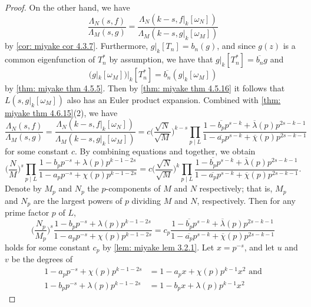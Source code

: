 \documentclass[10pt,leqno,twoside]{article}
\theoremstyle{plain}
\theoremstyle{definition}
\numberwithin{equation}{section}
\numberwithin{lem}{section}
\begin{document}
\begin{proof}
    On the other hand, we have
    \[\frac{\varLambda_N(s,f)}{\varLambda_M(s,g)} = \frac{\varLambda_N(k-s,f|_k[\omega_N])}{\varLambda_M(k-s,g|_k[\omega_M])}\] by \cref{cor: miyake cor 4.3.7}. Furthermore, $g|_k[T_n] = b_n(g)$, and since $g(z)$ is a common eigenfunction of $T^\ast_n$ by assumption, we have that $g|_k[T^\ast_n] = \overline{b_n}g$ and 
    \[(g|_k[\omega_M])|_k[T^\ast_n] = \overline{b_n}(g|_k[\omega_M])\] by \cref{thm: miyake thm 4.5.5}. Then by \cref{thm: miyake thm 4.5.16} it follows that $L(s, g|_k[\omega_M])$ also has an Euler product expansion. Combined with \cref{thm: miyake thm 4.6.15}(2), we have 
    \begin{equation}\label{eqn: ratio shifted varLambdas}
        \frac{\varLambda_N(s,f)}{\varLambda_M(s,g)} = \frac{\varLambda_N(k-s,f|_k[\omega_N])}{\varLambda_M(k-s,g|_k[\omega_M])} = c\bigg(\frac{\sqrt{N}}{\sqrt{M}}\bigg)^{k-s}\prod_{p\mid L}\frac{1-\overline{b_p}p^{s-k} + \overline{\lambda}(p)p^{2s-k-1}}{1-\overline{a_p}p^{s-k} + \overline{\chi}(p)p^{2s-k-1}}
    \end{equation} for some constant $c$. By combining equations  and  together, we obtain
    \[\bigg(\frac{N}{M}\bigg)^s\prod_{p\mid L}\frac{1-b_pp^{-s} + \lambda(p)p^{k-1-2s}}{1-a_pp^{-s} + \chi(p)p^{k-1-2s}} = c\bigg(\frac{\sqrt{N}}{\sqrt{M}}\bigg)^k\prod_{p\mid L}\frac{1-\overline{b_p}p^{s-k} + \overline{\lambda}(p)p^{2s-k-1}}{1-\overline{a_p}p^{s-k} + \overline{\chi}(p)p^{2s-k-1}}.\]
    Denote by $M_p$ and $N_p$ the $p$-components of $M$ and $N$ respectively; that is, $M_p$ and $N_p$ are the largest powers of $p$ dividing $M$ and $N$, respectively. Then for any prime factor $p$ of $L$, 
    \begin{equation}\label{eqn: p-comps}
        \bigg(\frac{N_p}{M_p}\bigg)^s\frac{1-b_pp^{-s} + \lambda(p)p^{k-1-2s}}{1-a_pp^{-s} + \chi(p)p^{k-1-2s}} = c_p
        \frac{1-\overline{b_p}p^{s-k} + \overline{\lambda}(p)p^{2s-k-1}}{1-\overline{a_p}p^{s-k} + \overline{\chi}(p)p^{2s-k-1}}
    \end{equation} holds for some constant $c_p$ by \cref{lem: miyake lem 3.2.1}. Let $x=p^{-s}$, and let $u$ and $v$ be the degrees of
    \begin{align*}
        1-a_pp^{-s} + \chi(p)p^{k-1-2s} &= 1-a_px + \chi(p)p^{k-1}x^2 \text{ and}\\
        1-b_pp^{-s} + \lambda(p)p^{k-1-2s} &= 1-b_px + \lambda(p)p^{k-1}x^2

\end{align*}
\end{proof}
\end{document}
